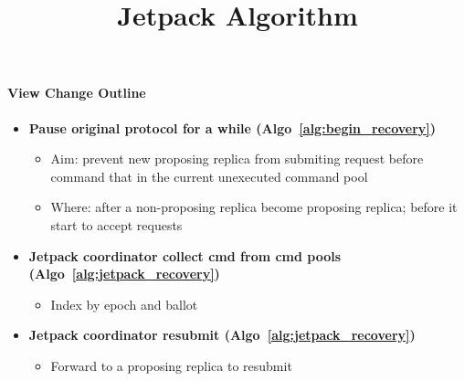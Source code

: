\documentclass[twocolumn]{article}
\begin{document}
\title{Jetpack Algorithm}
\maketitle


\paragraph{View Change Outline}

\begin{itemize}
  \setlength{\itemsep}{0pt}
  \item \textbf{Pause original protocol for a while (Algo~\ref{alg:begin_recovery})}
  \begin{itemize}
    \setlength{\itemsep}{0pt}
     \item Aim: prevent new proposing replica from submiting request before command that in the current unexecuted command pool
     \item Where: after a non-proposing replica become proposing replica; before it start to accept requests
  \end{itemize}
  
  \item \textbf{Jetpack coordinator collect cmd from cmd pools (Algo~\ref{alg:jetpack_recovery})}
  \begin{itemize}
    \setlength{\itemsep}{0pt}
    \item Index by epoch and ballot
  \end{itemize}
  
  \item \textbf{Jetpack coordinator resubmit (Algo~\ref{alg:jetpack_recovery})}
  \begin{itemize}
    \setlength{\itemsep}{0pt}
    \item Forward to a proposing replica to resubmit
  \end{itemize}
  
\end{itemize}
\end{document}
